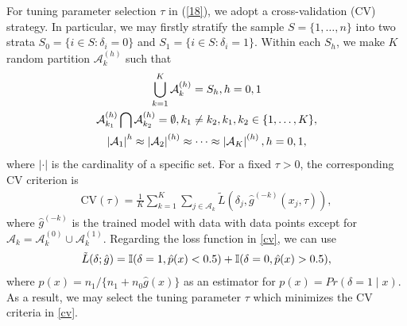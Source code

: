 \documentclass[12pt]{article}
\newcommand{\Abs}[1]{\left\vert#1\right\vert}
\begin{document}
For tuning parameter selection $\tau$ in (\ref{18}),  we adopt a cross-validation (CV) strategy. In particular, we may firstly stratify the sample $S = \{1, \ldots, n\}$ into two strata 
	$S_{0} =\{i\in S: \delta_{i} = 0\}$  and $S_{1} =\{i\in S: \delta_{i} = 1\}$. 
Within each $S_{h}$, we make $K$ random partition $\mathcal{A}_{k}^{(h)}$ such that
\begin{align}
\begin{gathered}
     \bigcup_{k=1}^{K}\mathcal{A}_{k}^{(h)} = S_{h}, h = 0, 1\notag\\
     \mathcal{A}_{k_{1}}^{(h)} \bigcap \mathcal{A}_{k_{2}}^{(h)} =  \emptyset, k_{1} \neq k_{2}, k_{1}, k_{2} \in \{1, \ldots, K\}, \notag\\
     \Abs{\mathcal{A}_{1}}^{h} \approx  \Abs{\mathcal{A}_{2}}^{(h)} \approx \cdots \approx \Abs{\mathcal{A}_{K}}^{(h)},  h = 0, 1,\notag
\end{gathered}
\end{align}
where $|\cdot|$ is the cardinality of a specific set. For a fixed $\tau > 0$, the corresponding CV criterion is
\begin{align}\label{cv}
	\mbox{CV}(\tau) = \frac{1}{K}\sum_{k=1}^{K}\sum_{j\in \mathcal{A}_{k}} \tilde{L}(\delta_{j},  \hat{g}^{(-k)}(x_{j}, \tau) ),
\end{align}
where $\hat{g}^{(-k)}$ is the trained model with data with data points except for $\mathcal{A}_{k} = \mathcal{A}_{k}^{(0)} \cup  \mathcal{A}_{k}^{(1)}$. Regarding the loss function in \eqref{cv}, we can use
\begin{align}
	\tilde{L}(\delta; \hat{g}) = \mathbb{I}(\delta = 1, \hat{p}(x) < 0.5   ) + \mathbb{I}(\delta = 0, \hat{p}(x) > 0.5   ),\notag
\end{align}
where $ 
	\hat{p}(x) = n_{1} /\{  n_{1} + n_{0}\hat{g}(x)    \} $ 
as an estimator for $p(x) = Pr(\delta = 1 \mid x)$. As a result, we may select the tuning parameter $\tau$ which minimizes the CV criteria in \eqref{cv}.


% 
%
% 
% 
% 
% 
% 




\end{document}
